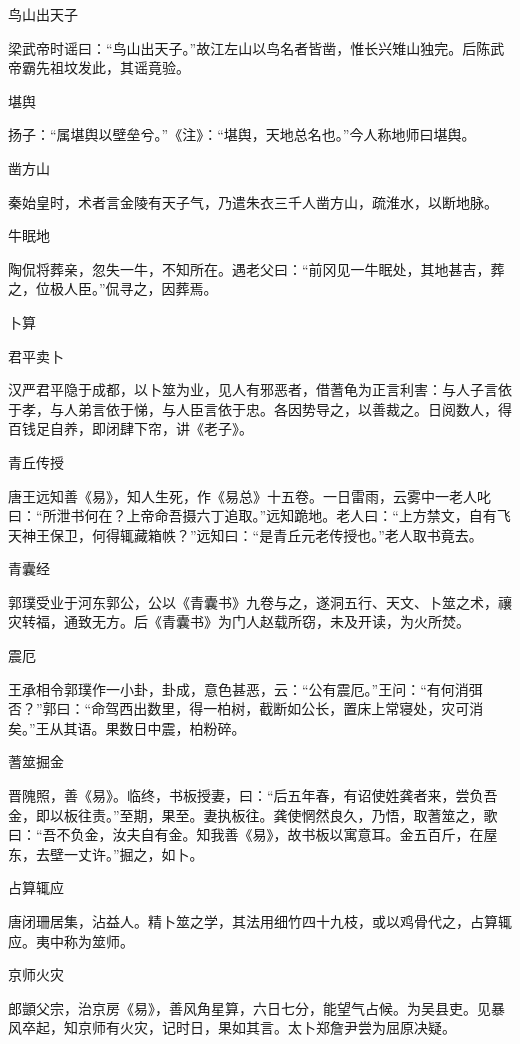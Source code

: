 \documentclass[a4paper,12pt,UTF8,twoside]{ctexbook}
\begin{document}
    鸟山出天子
    
    梁武帝时谣曰：“鸟山出天子。”故江左山以鸟名者皆凿，惟长兴雉山独完。后陈武帝霸先祖坟发此，其谣竟验。
    
    堪舆
    
    扬子：“属堪舆以壁垒兮。”《注》：“堪舆，天地总名也。”今人称地师曰堪舆。
    
    凿方山
    
    秦始皇时，术者言金陵有天子气，乃遣朱衣三千人凿方山，疏淮水，以断地脉。
    
    牛眠地
    
    陶侃将葬亲，忽失一牛，不知所在。遇老父曰：“前冈见一牛眠处，其地甚吉，葬之，位极人臣。”侃寻之，因葬焉。
    
    卜算
    
    君平卖卜
    
    汉严君平隐于成都，以卜筮为业，见人有邪恶者，借蓍龟为正言利害：与人子言依于孝，与人弟言依于悌，与人臣言依于忠。各因势导之，以善裁之。日阅数人，得百钱足自养，即闭肆下帘，讲《老子》。
    
    青丘传授
    
    唐王远知善《易》，知人生死，作《易总》十五卷。一日雷雨，云雾中一老人叱曰：“所泄书何在？上帝命吾摄六丁追取。”远知跪地。老人曰：“上方禁文，自有飞天神王保卫，何得辄藏箱帙？”远知曰：“是青丘元老传授也。”老人取书竟去。
    
    青囊经
    
    郭璞受业于河东郭公，公以《青囊书》九卷与之，遂洞五行、天文、卜筮之术，禳灾转福，通致无方。后《青囊书》为门人赵载所窃，未及开读，为火所焚。
    
    震厄
    
    王承相令郭璞作一小卦，卦成，意色甚恶，云：“公有震厄。”王问：“有何消弭否？”郭曰：“命驾西出数里，得一柏树，截断如公长，置床上常寝处，灾可消矣。”王从其语。果数日中震，柏粉碎。
    
    蓍筮掘金
    
    晋隗照，善《易》。临终，书板授妻，曰：“后五年春，有诏使姓龚者来，尝负吾金，即以板往责。”至期，果至。妻执板往。龚使惘然良久，乃悟，取蓍筮之，歌曰：“吾不负金，汝夫自有金。知我善《易》，故书板以寓意耳。金五百斤，在屋东，去壁一丈许。”掘之，如卜。
    
    占算辄应
    
    唐闭珊居集，沾益人。精卜筮之学，其法用细竹四十九枝，或以鸡骨代之，占算辄应。夷中称为筮师。
    
    京师火灾
    
    郎顗父宗，治京房《易》，善风角星算，六日七分，能望气占候。为吴县吏。见暴风卒起，知京师有火灾，记时日，果如其言。太卜郑詹尹尝为屈原决疑。
    
\end{document}
